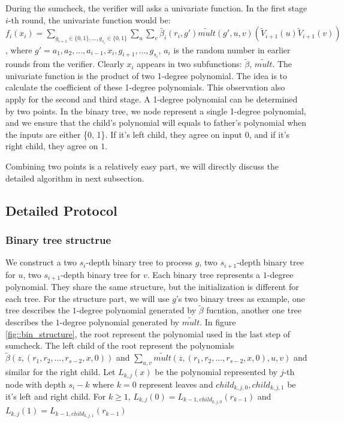 During the sumcheck, the verifier will asks a univariate function. In the first stage $i$-th round, the univariate function would be: $f_i(x_i)=\sum_{g_{i+1} \in \{0, 1\}, ..., g_{s_{i}} \in \{0, 1\}} \sum_{u} \sum_{v} \tilde{\beta_{i}}(r_i, g')\tilde{mult}(g', u, v)(\tilde{V}_{i+1}(u)\tilde{V}_{i+1}(v))$, where $g' = a_1, a_2, ..., a_{i-1}, x_{i}, g_{i+1}, ..., g_{s_i}$, $a_i$ is the random number in earlier rounds from the verifier. Clearly $x_i$ appears in two subfunctions: $\tilde{\beta}$, $\tilde{mult}$. The univariate function is the product of two 1-degree polynomial. The idea is to calculate the coefficient of these 1-degree polynomials. This observation also apply for the second and third stage. A 1-degree polynomial can be determined by two points. In the binary tree, we node represent a single 1-degree polynomial, and we ensure that the child's polynomial will equals to father's polynomial when the inputs are either \{0, 1\}. If it's left child, they agree on input $0$, and if it's right child, they agree on $1$.

Combining two points is a relatively easy part, we will directly discuss the detailed algorithm in next subsection.

\subsection{Detailed Protocol}
\subsubsection{Binary tree structrue}
We construct a two $s_i$-depth binary tree to process $g$, two $s_{i+1}$-depth binary tree for $u$, two $s_{i+1}$-depth binary tree for $v$. Each binary tree represents a $1$-degree polynomial. They share the same structure, but the initialization is different for each tree. For the structure part, we will use $g$'s two binary trees as example, one tree describes the $1$-degree polynomial generated by $\tilde{\beta}$ fucntion, another one tree describes the $1$-degree polynomial generated by $\tilde{mult}$. In figure \ref{fig::bin_structure}, the root represent the polynomial used in the last step of sumcheck. The left child of the root represent the polynomials $\tilde{\beta}(z, (r_1, r_2, ..., r_{s-2}, x, 0))$ and $\sum_{u, v}\tilde{mult}(z, (r_1, r_2, ..., r_{s-2}, x, 0), u, v)$ and similar for the right child. Let $L_{k, j}(x)$ be the polynomial represented by $j$-th node with depth $s_i - k$ where $k=0$ represent leaves and $child_{k, j, 0}, child_{k, j, 1}$ be it's left and right child. For $k \ge 1$, $L_{k, j}(0)=L_{k-1, child_{k, j, 0}}(r_{k-1})$ and $L_{k, j}(1)=L_{k-1, child_{k, j, 1}}(r_{k-1})$

